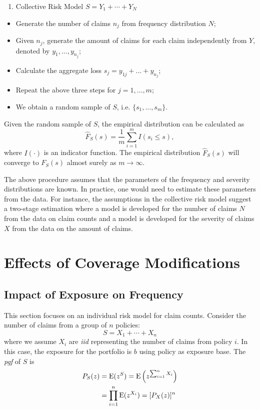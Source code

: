 \documentclass[]{book}
\providecommand{\tightlist}{%
  \setlength{\itemsep}{0pt}\setlength{\parskip}{0pt}}
\theoremstyle{definition}
\theoremstyle{definition}
\theoremstyle{definition}
\theoremstyle{remark}
\begin{document}
\begin{enumerate}
\def\labelenumi{\arabic{enumi}.}
\setcounter{enumi}{1}
\tightlist
\item
  Collective Risk Model \(S=Y_1+\cdots+Y_N\)
\end{enumerate}

\begin{itemize}
\item
  Generate the number of claims \(n_j\) from frequency distribution
  \(N\);
\item
  Given \(n_j\), generate the amount of claims for each claim
  independently from \(Y\), denoted by \(y_{1},\ldots,y_{n_j}\);
\item
  Calculate the aggregate loss \(s_j=y_{1j}+\ldots+y_{n_j}\);
\item
  Repeat the above three steps for \(j=1,\ldots,m\);
\item
  We obtain a random sample of \(S\), i.e. \(\{s_1,\ldots,s_m\}\).
\end{itemize}

Given the random sample of \(S\), the empirical distribution can be
calculated as \[\hat{F}_S(s)=\frac{1}{m}\sum_{i=1}^{m}I(s_i\leq s),\]
where \(I(\cdot)\) is an indicator function. The empirical distribution
\(\hat{F}_S(s)\) will converge to \({F}_S(s)\) almost surely as
\(m\rightarrow \infty\).

The above procedure assumes that the parameters of the frequency and
severity distributions are known. In practice, one would need to
estimate these parameters from the data. For instance, the assumptions
in the collective risk model suggest a two-stage estimation where a
model is developed for the number of claims \(N\) from the data on claim
counts and a model is developed for the severity of claims \(X\) from
the data on the amount of claims.

\section{Effects of Coverage
Modifications}\label{effects-of-coverage-modifications}

\subsection{Impact of Exposure on
Frequency}\label{impact-of-exposure-on-frequency}

This section focuses on an individual risk model for claim counts.
Consider the number of claims from a group of \(n\) policies:
\[S=X_1+\cdots+X_n\] where we assume \(X_i\) are \emph{iid} representing
the number of claims from policy \(i\). In this case, the exposure for
the portfolio is \(b\) using policy as exposure base. The \emph{pgf} of
\(S\) is \[\begin{aligned}
P_S(z)&={\rm E}(z^S)={\rm E}\left(z^{\sum_{i=1}^nX_i}\right)\\
&=\prod_{i=1}^n{\rm E}(z^{X_i})=[P_X(z)]^n
\end{aligned}\]
\end{document}
